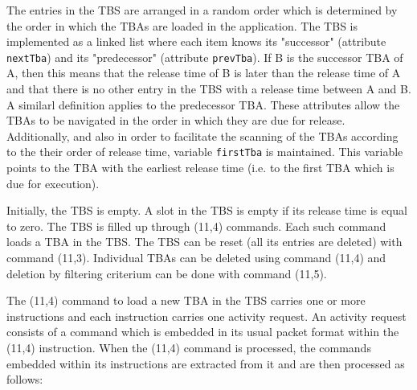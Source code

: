 \documentclass{pnp_article}
\begin{document}
The entries in the TBS are arranged in a random order which is determined by the order in which the TBAs are loaded in the application. The TBS is implemented as a linked list where each item knows its "successor" (attribute \texttt{nextTba}) and its "predecessor" (attribute \texttt{prevTba}). If B is the successor TBA of A, then this means that the release time of B is later than the release time of A and that there is no other entry in the TBS with a release time between A and B. A similarl definition applies to the predecessor TBA. These attributes allow the TBAs to be navigated in the order in which they are due for release. Additionally, and also in order to facilitate the scanning of the TBAs according to the their order of release time, variable \texttt{firstTba} is maintained. This variable points to the TBA with the earliest release time (i.e. to the first TBA which is due for execution). 

Initially, the TBS is empty. A slot in the TBS is empty if its release time is equal to zero. The TBS is filled up through (11,4) commands. Each such command loads a TBA in the TBS. The TBS can be reset (all its entries are deleted) with command (11,3). Individual TBAs can be deleted using command (11,4) and deletion by filtering criterium can be done with command (11,5).

The (11,4) command to load a new TBA in the TBS carries one or more instructions and each instruction carries one activity request. An activity request consists of a command which is embedded in its usual packet format within the (11,4) instruction. When the (11,4) command is processed, the commands embedded within its instructions are extracted from it and are then processed as follows:
\end{document}
